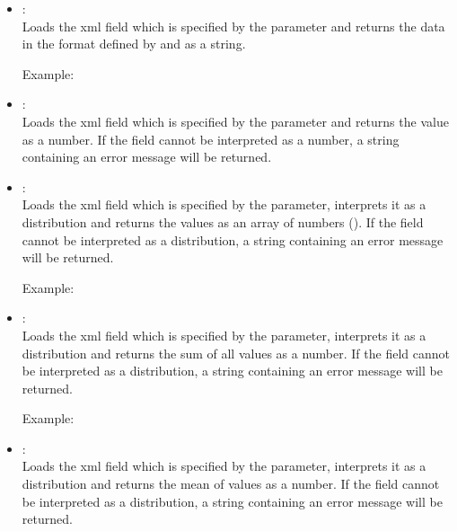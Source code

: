 \begin{itemize}

\item
{}:\\
Loads the xml field which is specified by the parameter and returns the data in the format
defined by  and  as a string.

Example: 

\item
{}:\\
Loads the xml field which is specified by the parameter and returns the value as a  number.
If the field cannot be interpreted as a number, a string containing an error message will be returned.  

\item
{}:\\
Loads the xml field which is specified by the parameter, interprets it as a distribution and
returns the values as an array of numbers ().
If the field cannot be interpreted as a distribution, a string containing an error message will be returned.

Example:\\

\item
{}:\\
Loads the xml field which is specified by the parameter, interprets it as a distribution and
returns the sum of all values as a  number.
If the field cannot be interpreted as a distribution, a string containing an error message will be returned.

Example:\\

\item
{}:\\
Loads the xml field which is specified by the parameter, interprets it as a distribution and
returns the mean of values as a  number.
If the field cannot be interpreted as a distribution, a string containing an error message will be returned.


\end{itemize}
